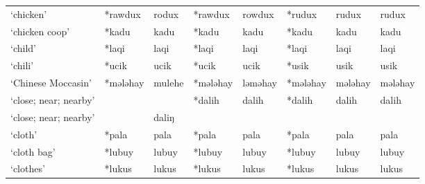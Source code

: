 \begin{landscape}
\begin{longtable}[c]{@{}p{3cm}<{\raggedright}p{2.75cm}<{\raggedright}p{2.75cm}<{\raggedright}p{2.75cm}<{\raggedright}p{2.75cm}<{\raggedright}p{2.75cm}<{\raggedright}p{2.75cm}<{\raggedright}p{2.75cm}<{\raggedright}@{}}
`chicken'                                            & *rawdux            & rodux                          & *rawdux            & rowdux                     & *rudux           & rudux                    & rudux                             \\
`chicken coop'                                       & *kadu              & kadu                           & *kadu              & kadu                       & *kadu            & kadu                     & kadu                              \\
`child'                                              & *laqi              & laqi                           & *laqi              & laqi                       & *laqi            & laqi                     & laqi                              \\
`chili'                                              & *ucik              & ucik                           & *ucik              & ucik                       & *usik            & usik                     & usik                              \\
`Chinese Moccasin'                                   & *mələhay           & mulehe                         & *mələhay           & ləməhay                    & *mələhay         & mələhay                  & mələhay                           \\
`close; near; nearby'                                &              &                                & *dalih             & dalih                      & *dalih           & dalih                    & dalih                             \\
`close; near; nearby'                                &              & daliŋ                          &                    &                            &                  &                          &                                   \\
`cloth'                                              & *pala              & pala                           & *pala              & pala                       & *pala            & pala                     & pala                              \\
`cloth bag'                                          & *lubuy             & lubuy                          & *lubuy             & lubuy                      & *lubuy           & lubuy                    & lubuy                             \\
`clothes'                                            & *lukus             & lukus                          & *lukus             & lukus                      & *lukus           & lukus                    & lukus                             \\

\end{longtable}
\end{landscape}
